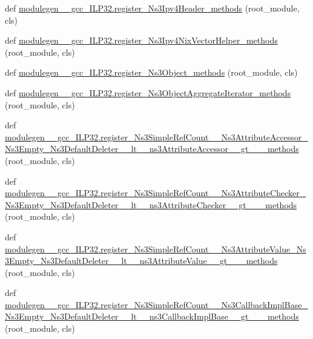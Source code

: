 \begin{DoxyCompactItemize}
\item 
def \hyperlink{namespacemodulegen____gcc__ILP32_ae181c555d878440a25faf5f74ee7e8a1}{modulegen\+\_\+\+\_\+gcc\+\_\+\+I\+L\+P32.\+register\+\_\+\+Ns3\+Ipv4\+Header\+\_\+methods} (root\+\_\+module, cls)
\item 
def \hyperlink{namespacemodulegen____gcc__ILP32_a07dccf02569876d28ffb2770bbaa3f5b}{modulegen\+\_\+\+\_\+gcc\+\_\+\+I\+L\+P32.\+register\+\_\+\+Ns3\+Ipv4\+Nix\+Vector\+Helper\+\_\+methods} (root\+\_\+module, cls)
\item 
def \hyperlink{namespacemodulegen____gcc__ILP32_a214a6e153873bc8ca6880fc3f4cb4cb0}{modulegen\+\_\+\+\_\+gcc\+\_\+\+I\+L\+P32.\+register\+\_\+\+Ns3\+Object\+\_\+methods} (root\+\_\+module, cls)
\item 
def \hyperlink{namespacemodulegen____gcc__ILP32_aa803b137018709bb9ce4e0561d4ce0c7}{modulegen\+\_\+\+\_\+gcc\+\_\+\+I\+L\+P32.\+register\+\_\+\+Ns3\+Object\+Aggregate\+Iterator\+\_\+methods} (root\+\_\+module, cls)
\item 
def \hyperlink{namespacemodulegen____gcc__ILP32_ac3ab36c44430c9b0f0301233bd18935b}{modulegen\+\_\+\+\_\+gcc\+\_\+\+I\+L\+P32.\+register\+\_\+\+Ns3\+Simple\+Ref\+Count\+\_\+\+\_\+\+Ns3\+Attribute\+Accessor\+\_\+\+Ns3\+Empty\+\_\+\+Ns3\+Default\+Deleter\+\_\+\+\_\+lt\+\_\+\+\_\+ns3\+Attribute\+Accessor\+\_\+\+\_\+gt\+\_\+\+\_\+\+\_\+methods} (root\+\_\+module, cls)
\item 
def \hyperlink{namespacemodulegen____gcc__ILP32_a8e35760026d969bed52bf02d5751f184}{modulegen\+\_\+\+\_\+gcc\+\_\+\+I\+L\+P32.\+register\+\_\+\+Ns3\+Simple\+Ref\+Count\+\_\+\+\_\+\+Ns3\+Attribute\+Checker\+\_\+\+Ns3\+Empty\+\_\+\+Ns3\+Default\+Deleter\+\_\+\+\_\+lt\+\_\+\+\_\+ns3\+Attribute\+Checker\+\_\+\+\_\+gt\+\_\+\+\_\+\+\_\+methods} (root\+\_\+module, cls)
\item 
def \hyperlink{namespacemodulegen____gcc__ILP32_ae37f0969d06fd5e11e962c9b2a58d222}{modulegen\+\_\+\+\_\+gcc\+\_\+\+I\+L\+P32.\+register\+\_\+\+Ns3\+Simple\+Ref\+Count\+\_\+\+\_\+\+Ns3\+Attribute\+Value\+\_\+\+Ns3\+Empty\+\_\+\+Ns3\+Default\+Deleter\+\_\+\+\_\+lt\+\_\+\+\_\+ns3\+Attribute\+Value\+\_\+\+\_\+gt\+\_\+\+\_\+\+\_\+methods} (root\+\_\+module, cls)
\item 
def \hyperlink{namespacemodulegen____gcc__ILP32_a1725745354fc64e505a347b59ad09428}{modulegen\+\_\+\+\_\+gcc\+\_\+\+I\+L\+P32.\+register\+\_\+\+Ns3\+Simple\+Ref\+Count\+\_\+\+\_\+\+Ns3\+Callback\+Impl\+Base\+\_\+\+Ns3\+Empty\+\_\+\+Ns3\+Default\+Deleter\+\_\+\+\_\+lt\+\_\+\+\_\+ns3\+Callback\+Impl\+Base\+\_\+\+\_\+gt\+\_\+\+\_\+\+\_\+methods} (root\+\_\+module, cls)

\end{DoxyCompactItemize}
